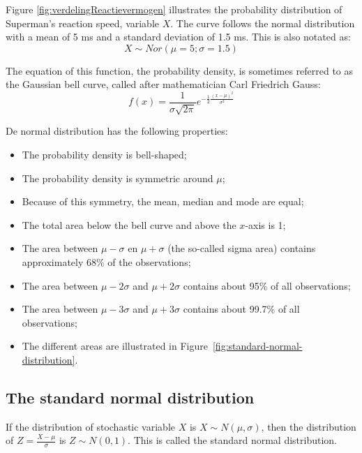 Figure \ref{fig:verdelingReactievermogen} illustrates the probability distribution of Superman's reaction speed, variable $X$. The curve follows the normal distribution with a mean of 5 ms and a standard deviation of 1.5 ms. This is also notated as:
\[ X  \sim Nor(\mu = 5; \sigma = 1.5) \]

The equation of this function, the probability density, is sometimes referred to as the Gaussian bell curve, called after mathematician Carl Friedrich Gauss:
\begin{equation}
  f(x) = \frac{1}{\sigma \sqrt{2\pi}} e^{-\frac{1}{2} \frac{(x - \mu)^{2}}{\sigma^{2}}}
  \label{eq:normalFunction}
\end{equation}

De normal distribution has the following properties:
\begin{itemize}
  \item The probability density is bell-shaped;
  \item The probability density is symmetric around $\mu$;
  \item Because of this symmetry, the mean, median and mode are equal;
  \item The total area below the bell curve and above the $x$-axis is 1;
  \item The area between $\mu - \sigma$ en $\mu + \sigma$ (the so-called sigma area) contains approximately 68\% of the observations;
  \item The area between $\mu - 2 \sigma$ and $\mu + 2 \sigma$ contains about 95\% of all observations;
  \item The area between $\mu - 3 \sigma$ and $\mu + 3 \sigma$ contains about 99.7\% of all observations;
  \item The different areas are illustrated in Figure~\ref{fig:standard-normal-distribution}.
\end{itemize}

\subsection{The standard normal distribution}
\label{ssec:standard-normal-distribution}

If the distribution of stochastic variable $X$ is $X \sim N(\mu, \sigma)$, then the distribution of $Z = \frac{X - \mu}{\sigma}$ is $Z \sim N(0,1)$. This is called the standard normal distribution.

